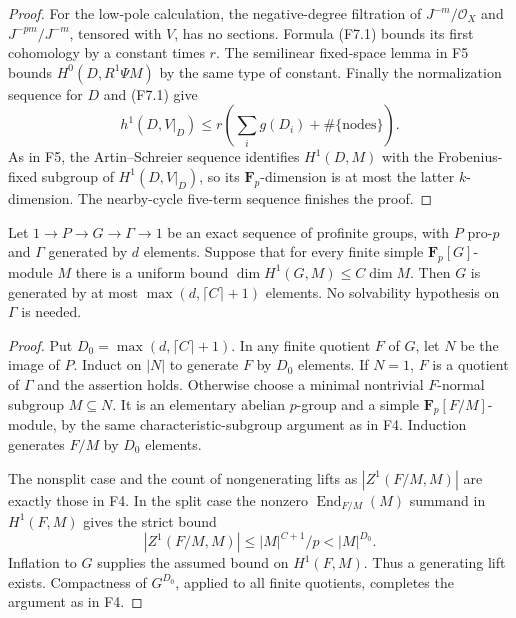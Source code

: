 \begin{proof}
For the low-pole calculation, the negative-degree filtration of
$J^{-m}/\mathcal O_X$ and $J^{-pm}/J^{-m}$, tensored with $V$,
has no sections. Formula (F7.1) bounds its first cohomology by a
constant times $r$. The semilinear fixed-space lemma in F5 bounds
$H^0(D,R^1\Psi M)$ by the same type of constant. Finally the
normalization sequence for $D$ and (F7.1) give
\[
 h^1(D,V|_D)\leq r\left(\sum_i g(D_i)+\#\{\text{nodes}\}\right).
\]
As in F5, the Artin--Schreier sequence identifies $H^1(D,M)$ with
the Frobenius-fixed subgroup of $H^1(D,V|_D)$, so its
$\mathbf F_p$-dimension is at most the latter $k$-dimension.
The nearby-cycle five-term sequence finishes the proof.
\end{proof}

\begin{lemma}
Let $1\to P\to G\to\Gamma\to1$ be an exact sequence of profinite
groups, with $P$ pro-$p$ and $\Gamma$ generated by $d$ elements.
Suppose that for every finite simple $\mathbf F_p[G]$-module $M$
there is a uniform bound
$\dim H^1(G,M)\leq C\dim M$. Then $G$ is generated by at most
$\max(d,\lceil C\rceil+1)$ elements. No solvability hypothesis on
$\Gamma$ is needed.
\end{lemma}
\begin{proof}
Put $D_0=\max(d,\lceil C\rceil+1)$. In any finite quotient $F$
of $G$, let $N$ be the image of $P$. Induct on $|N|$ to generate
$F$ by $D_0$ elements. If $N=1$, $F$ is a quotient of $\Gamma$
and the assertion holds. Otherwise choose a minimal nontrivial
$F$-normal subgroup $M\subseteq N$. It is an elementary abelian
$p$-group and a simple $\mathbf F_p[F/M]$-module, by the same
characteristic-subgroup argument as in F4. Induction generates
$F/M$ by $D_0$ elements.

The nonsplit case and the count of nongenerating lifts as
$|Z^1(F/M,M)|$ are exactly those in F4. In the split case the
nonzero $\operatorname{End}_{F/M}(M)$ summand in $H^1(F,M)$
gives the strict bound
\[
 |Z^1(F/M,M)|\leq |M|^{C+1}/p<|M|^{D_0}.
\]
Inflation to $G$ supplies the assumed bound on $H^1(F,M)$.
Thus a generating lift exists. Compactness of $G^{D_0}$, applied
to all finite quotients, completes the argument as in F4.
\end{proof}

